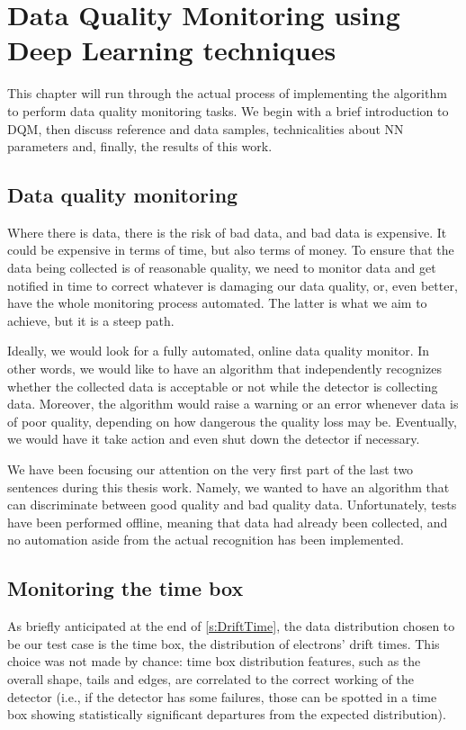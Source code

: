 \chapter{Data Quality Monitoring using Deep Learning techniques}
\label{chap:Results}

This chapter will run through the actual process of implementing the algorithm to perform data quality monitoring tasks.
We begin with a brief introduction to DQM, then discuss reference and data samples, technicalities about NN parameters
and, finally, the results of this work.

\section{Data quality monitoring}\label{sec:DQM}

Where there is data, there is the risk of bad data, and bad data is expensive. It could be expensive in terms of time,
but also terms of money. To ensure that the data being collected is of reasonable quality, we need to monitor data and
get notified in time to correct whatever is damaging our data quality, or, even better, have the whole monitoring
process automated. The latter is what we aim to achieve, but it is a steep path. 

Ideally, we would look for a fully automated, online data quality monitor. In other words, we would like to have an
algorithm that independently recognizes whether the collected data is acceptable or not while the detector is collecting
data. Moreover, the algorithm would raise a warning or an error whenever data is of poor quality, depending on how
dangerous the quality loss may be. Eventually, we would have it take action and even shut down the detector if
necessary. 

We have been focusing our attention on the very first part of the last two sentences during this thesis work. Namely, we
wanted to have an algorithm that can discriminate between good quality and bad quality data. Unfortunately, tests have
been performed offline, meaning that data had already been collected, and no automation aside from the actual
recognition has been implemented.  

\section{Monitoring the time box}

As briefly anticipated at the end of \autoref{s:DriftTime}, the data distribution chosen to be our test case is the time
box, the distribution of electrons' drift times. This choice was not made by chance: time box distribution features,
such as the overall shape, tails and edges, are correlated to the correct working of the detector (i.e., if the detector
has some failures, those can be spotted in a time box showing statistically significant departures from the expected
distribution).

